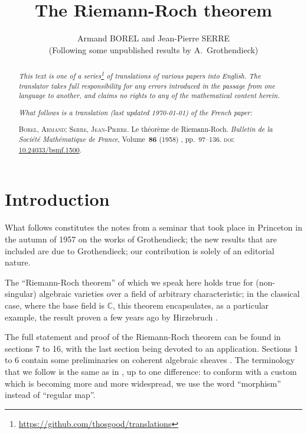 \documentclass{article}
\theoremstyle{plain}
\theoremstyle{definition}
\newcommand{\oldpage}[1]{\marginpar{\footnotesize$\Big\vert$ \textit{p.~#1}}}
\begin{document}
\renewcommand{\abstractname}{Translator's note.}

\title{The Riemann-Roch theorem}
\author{Armand BOREL and Jean-Pierre SERRE\\(Following some unpublished results by A.~Grothendieck)}
\date{}
\maketitle

\begin{abstract}
  \renewcommand*{\thefootnote}{\fnsymbol{footnote}}
  \emph{This text is one of a series\footnote{\url{https://github.com/thosgood/translations}} of translations of various papers into English.}
  \emph{The translator takes full responsibility for any errors introduced in the passage from one language to another, and claims no rights to any of the mathematical content herein.}
  
  \emph{What follows is a translation (last updated \today) of the French paper:}

  \medskip\noindent
  \textsc{Borel, Armand}; \textsc{Serre, Jean-Pierre}. Le th\'{e}or\`{e}me de Riemann-Roch. \emph{Bulletin de la Soci\'{e}t\'{e} Math\'{e}matique de France}, Volume~\textbf{86} (1958) , pp.~97--136. \textsc{doi}: \href{https://www.doi.org/10.24033/bsmf.1500}{10.24033/bsmf.1500}.
\end{abstract}

\setcounter{footnote}{0}

\tableofcontents



\section*{Introduction}

\oldpage{97}
What follows constitutes the notes from a seminar that took place in Princeton in the autumn of 1957 on the works of Grothendieck;
the new results that are included are due to Grothendieck;
our contribution is solely of an editorial nature.

The ``Riemann-Roch theorem'' of which we speak here holds true for (non-singular) algebraic varieties over a field of arbitrary characteristic;
in the classical case, where the base field is $\mathbb{C}$, this theorem encapsulates, as a particular example, the result proven a few years ago by Hirzebruch \cite{9}.

The full statement and proof of the Riemann-Roch theorem can be found in sections 7 to 16, with the last section being devoted to an application.
Sections 1 to 6 contain some preliminaries on coherent algebraic sheaves \cite{12}.
The terminology that we follow is the same as in \cite{12}, up to one difference: to conform with a custom which is becoming more and more widespread, we use the word ``morphism'' instead of ``regular map''.
\end{document}
